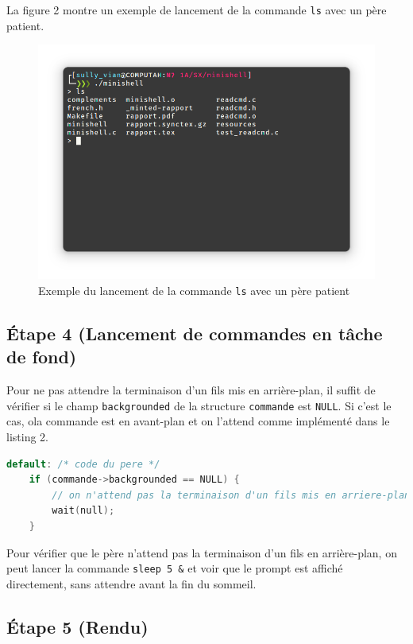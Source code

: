 \documentclass{article}
\begin{document}
La figure 2 montre un exemple de lancement de la commande \texttt{ls} avec un père patient.

\begin{figure}[H]
    \centering
    \includegraphics[width=1\textwidth]{./resources/E3.png}
    \caption{Exemple du lancement de la commande \texttt{ls} avec un père patient}
    \label{fig:E3}
\end{figure}

\subsection*{Étape 4 (Lancement de commandes en tâche de fond)}

Pour ne pas attendre la terminaison d'un fils mis en arrière-plan, il suffit de vérifier si le champ \texttt{backgrounded} de la structure \texttt{commande} est \texttt{NULL}. Si c'est le cas, ola commande est en avant-plan et on l'attend comme implémenté dans le listing 2.

\begin{lstlisting}[language=C, caption=Ajout pour la question 4]
default: /* code du pere */
    if (commande->backgrounded == NULL) {
        // on n'attend pas la terminaison d'un fils mis en arriere-plan
        wait(null);
    }
\end{lstlisting}

Pour vérifier que le père n'attend pas la terminaison d'un fils en arrière-plan, on peut lancer la commande \texttt{sleep 5 \&} et voir que le prompt est affiché directement, sans attendre avant la fin du sommeil.

\subsection*{Étape 5 (Rendu)}
\end{document}
